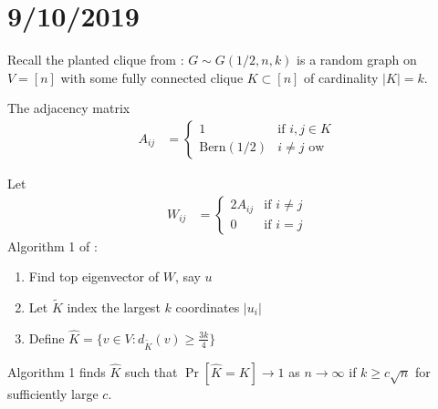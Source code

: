 \section{9/10/2019}

Recall the planted clique from \cite{alon1998finding}: $G \sim G(1/2, n, k)$
is a random graph on $V = [n]$ with some fully connected
clique $K \subset [n]$ of cardinality $\lvert K \rvert = k$.

The adjacency matrix
\begin{align}
  A_{ij} &=
  \begin{cases}
    1 &\text{if }i,j \in K \\
    \text{Bern}(1/2) &\text{$i \neq j$ ow}
  \end{cases}
\end{align}

Let
\begin{align}
    W_{ij} &= \begin{cases}
        2 A_{ij} &\text{if }i \neq j \\
        0 &\text{if }i = j
    \end{cases}
\end{align}
Algorithm 1 of \cite{alon1998finding}:
\begin{enumerate}
    \item Find top eigenvector of $W$, say $u$
    \item Let $\tilde{K}$ index the largest $k$ coordinates $\lvert u_i \rvert$
    \item Define $\hat{K} = \{ v \in V : d_{\tilde{K}}(v) \geq \frac{3 k}{4} \}$
\end{enumerate}

\begin{theorem}
    Algorithm 1 finds $\hat{K}$ such that $\Pr[\hat{K} = K] \to 1$ as $n \to \infty$
    if $k \geq c \sqrt{n}$ for sufficiently large $c$.
\end{theorem}

